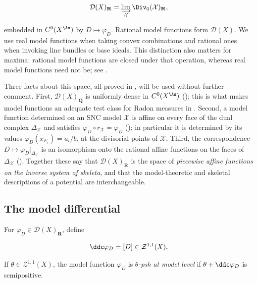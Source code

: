 \begin{equation}
\label{eq:ch20-model-functions}
 \mathcal D(X)_{\mathbf R}
   =\varinjlim_{\mathcal X}\Div_0(\mathcal X)_{\mathbf R},
\end{equation}

embedded in \(C^0(X^{\An})\) by \(D\mapsto\varphi_D\).  Rational model
functions form \(\mathcal D(X)\).  We use real model functions when taking
convex combinations and rational ones when invoking line bundles or base
ideals.  This distinction also matters for maxima: rational model functions
are closed under that operation, whereas real model functions need not be;
see .

Three facts about this space, all proved in ,
will be used without further comment.  First, \(\mathcal D(X)_{\mathbf Q}\)
is uniformly dense in \(C^0(X^{\An})\)
(); this is what makes model
functions an adequate test class for Radon measures in
.  Second, a model function determined on an SNC model
\(\mathcal X\) is affine on every face of the dual complex
\(\Delta_{\mathcal X}\) and satisfies
\(\varphi_D\circ r_{\mathcal X}=\varphi_D\)
(); in particular it is determined by its
values \(\varphi_D(x_{E_i})=a_i/b_i\) at the divisorial points of
\(\mathcal X\).  Third, the correspondence
\(D\mapsto\varphi_D|_{\Delta_{\mathcal X}}\) is an isomorphism onto the
rational affine functions on the faces of \(\Delta_{\mathcal X}\)
().  Together these say that
\(\mathcal D(X)_{\mathbf R}\) is the space of \emph{piecewise affine
functions on the inverse system of skeleta}, and that the model-theoretic
and skeletal descriptions of a potential are interchangeable.

\subsection{The model differential}
\label{sec:ch20-ddc-definition}

\begin{definition}
\label{def:ch20-ddc}
For \(\varphi_D\in\mathcal D(X)_{\mathbf R}\), define

\begin{equation}
\label{eq:ch20-ddc}
                         \ddc\varphi_D=[D]
                         \in\mathcal Z^{1,1}(X).
\end{equation}

If \(\theta\in\mathcal Z^{1,1}(X)\), the model function \(\varphi_D\) is
\emph{\(\theta\)-psh at model level} if
\(\theta+\ddc\varphi_D\) is semipositive.
\end{definition}

